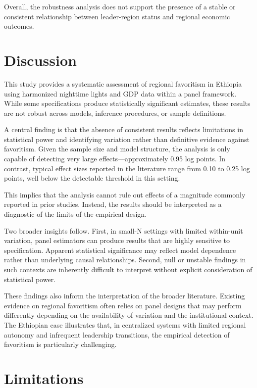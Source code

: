 \documentclass[12pt,a4paper]{article}
\begin{document}
Overall, the robustness analysis does not support the presence of a stable or consistent relationship between leader-region status and regional economic outcomes.

\section{Discussion}

This study provides a systematic assessment of regional favoritism in Ethiopia using harmonized nighttime lights and GDP data within a panel framework. While some specifications produce statistically significant estimates, these results are not robust across models, inference procedures, or sample definitions.

A central finding is that the absence of consistent results reflects limitations in statistical power and identifying variation rather than definitive evidence against favoritism. Given the sample size and model structure, the analysis is only capable of detecting very large effects—approximately 0.95 log points. In contrast, typical effect sizes reported in the literature range from 0.10 to 0.25 log points, well below the detectable threshold in this setting.

This implies that the analysis cannot rule out effects of a magnitude commonly reported in prior studies. Instead, the results should be interpreted as a diagnostic of the limits of the empirical design.

Two broader insights follow. First, in small-N settings with limited within-unit variation, panel estimators can produce results that are highly sensitive to specification. Apparent statistical significance may reflect model dependence rather than underlying causal relationships. Second, null or unstable findings in such contexts are inherently difficult to interpret without explicit consideration of statistical power.

These findings also inform the interpretation of the broader literature. Existing evidence on regional favoritism often relies on panel designs that may perform differently depending on the availability of variation and the institutional context. The Ethiopian case illustrates that, in centralized systems with limited regional autonomy and infrequent leadership transitions, the empirical detection of favoritism is particularly challenging.

\section{Limitations}
\end{document}

